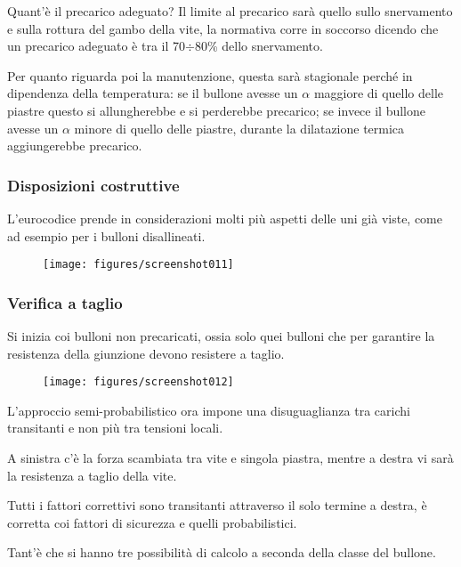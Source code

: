 \documentclass[a4paper, 15pt]{article}
\begin{document}
\begin{adjustwidth}{2in}{}
	 Quant'è il precarico adeguato? Il limite al precarico sarà quello sullo snervamento e sulla rottura del gambo della vite, la normativa corre  in soccorso dicendo che un precarico adeguato è tra il 70$\div$80\% dello snervamento. 
	 
	 Per quanto riguarda poi la manutenzione, questa sarà stagionale perché in dipendenza della temperatura: se il bullone avesse un $\alpha$ maggiore di quello delle piastre questo si allungherebbe e si perderebbe precarico; se invece il bullone avesse un $\alpha$ minore di quello delle piastre, durante la dilatazione termica aggiungerebbe precarico. 
\end{adjustwidth}
\newpage
\subsubsection{Disposizioni costruttive}
\begin{adjustwidth}{2in}{}	 
	L'eurocodice prende in considerazioni molti più aspetti delle uni già viste, come ad esempio per i bulloni disallineati. 
	\begin{figure}[H]
		\centering
		\texttt{[image: figures/screenshot011]}
		\label{fig:screenshot011}
	\end{figure}
\end{adjustwidth}
\subsubsection{Verifica a taglio}
\begin{adjustwidth}{2in}{}	
	Si inizia coi bulloni non precaricati, ossia solo quei bulloni che per garantire la resistenza della giunzione devono resistere a taglio. 	
	 \begin{figure}[H]
	 	\centering
	 	\texttt{[image: figures/screenshot012]}
	 	\label{fig:screenshot012}
	 \end{figure}
	 L'approccio semi-probabilistico ora impone una disuguaglianza tra carichi transitanti e non più tra tensioni locali. 
	 
	 A sinistra c'è la forza scambiata tra vite e singola piastra, mentre a destra vi sarà la resistenza a taglio della vite. 
	 
	 Tutti i fattori correttivi sono transitanti attraverso il solo termine a destra, è corretta coi fattori di sicurezza e quelli probabilistici. 
	 
	 Tant'è che si hanno tre possibilità di calcolo a seconda della classe del bullone. 
\end{adjustwidth}
\newpage
\end{document}
